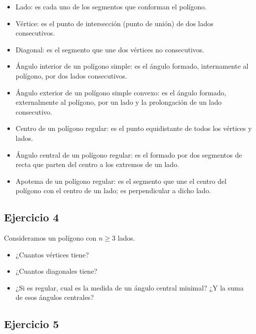 \begin{itemize}
\item Lado: es cada uno de los segmentos que conforman el polígono.
\item Vértice: es el punto de intersección (punto de unión) de dos lados consecutivos.
\item Diagonal: es el segmento que une dos vértices no consecutivos.
\item Ángulo interior de un polígono simple: es el ángulo formado, internamente al polígono, por dos lados consecutivos.
\item Ángulo exterior de un polígono simple convexo: es el ángulo formado,
  externalmente al polígono,
  por un lado y la prolongación de un lado consecutivo.
\item Centro de un polígono regular: es el punto equidistante de todos los vértices y lados.
\item Ángulo central de un polígono regular:
  es el formado por dos segmentos de recta que parten del centro a los extremos
  de un lado.
\item Apotema de un polígono regular: es el segmento que une el centro del polígono con el centro de un lado; es perpendicular a dicho lado.
\end{itemize}

\subsection{Ejercicio 4}

Consideramos un polígono con $n \geq 3$ lados.

\begin{itemize}
\item ¿Cuantos vértices tiene?
\item ¿Cuantos diagonales tiene?
\item ¿Si es regular, cual es la medida de un ángulo central minimal?
  ¿Y la suma de esos ángulos centrales?
\end{itemize}

\subsection{Ejercicio 5}

